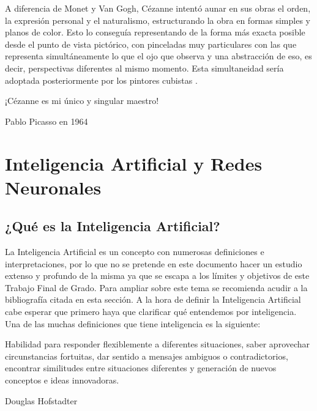 \documentclass[../main.tex]{subfiles}
\begin{document}
A diferencia de Monet y Van Gogh, Cézanne intentó aunar en sus obras el orden, la expresión personal y el naturalismo, estructurando la obra en formas simples y planos de color. Esto lo conseguía representando de la forma más exacta posible desde el punto de vista pictórico, con pinceladas muy particulares con las que representa simultáneamente lo que el ojo que observa y una abstracción de eso, es decir, perspectivas diferentes al mismo momento. Esta simultaneidad sería adoptada posteriormente por los pintores cubistas \cite{CalvoSantos2016-3}.

 \begin{center}
    \begin{minipage}{0.9\linewidth}
        \vspace{5pt}%
        {\small
            ¡Cézanne es mi único y singular maestro!
        }
        \begin{flushright} Pablo Picasso en 1964 \cite{WikiquoteCezanne}
        \end{flushright}
        \vspace{1pt}%
    \end{minipage}
\end{center}

\section{Inteligencia Artificial y Redes Neuronales}
\subsection{¿Qué es la Inteligencia Artificial?}
La Inteligencia Artificial es un concepto con numerosas definiciones e interpretaciones, por lo que no se pretende en este documento hacer un estudio extenso y profundo de la misma ya que se escapa a los límites y objetivos de este Trabajo Final de Grado. Para ampliar sobre este tema se recomienda acudir a la bibliografía citada en esta sección. \newline
A la hora de definir la Inteligencia Artificial cabe esperar que primero haya que clarificar qué entendemos por inteligencia. Una de las muchas definiciones que tiene inteligencia es la siguiente:

 \begin{center}
    \begin{minipage}{0.9\linewidth}
        \vspace{5pt}%
        {\small
            Habilidad para responder flexiblemente a diferentes situaciones, saber aprovechar circunstancias fortuitas, dar sentido a mensajes ambiguos o contradictorios, encontrar similitudes entre situaciones diferentes y generación de nuevos conceptos e ideas innovadoras.
        }
        \begin{flushright} Douglas Hofstadter \cite{Garcia2012}
        \end{flushright}
        \vspace{3pt}%
    \end{minipage}
\end{center}
\end{document}
